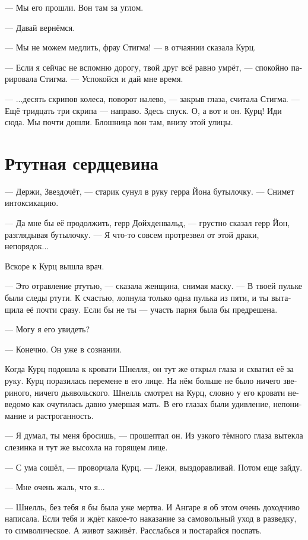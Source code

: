 \documentclass[a4paper,12pt,fleqn]{book}\usepackage{polyglossia}\setdefaultlanguage[babelshorthands=true]{russian}\setotherlanguage{english}\defaultfontfeatures{Ligatures=TeX,Mapping=tex-text}\usepackage{xcolor}\newcommand{\ml}[3]{#2}
\begin{document}
--- Мы его прошли.
Вон там за углом.

--- Давай вернёмся.

--- Мы не можем медлить, фрау Стигма! --- в отчаянии сказала Курц.

--- Если я сейчас не вспомню дорогу, твой друг всё равно умрёт, --- спокойно парировала Стигма.
--- Успокойся и дай мне время.

--- ...десять скрипов колеса, поворот налево, --- закрыв глаза, считала Стигма.
--- Ещё тридцать три скрипа --- направо.
Здесь спуск.
О, а вот и он.
Курц!
Иди сюда.
Мы почти дошли.
\ml{$0$}
{Блошница вон там, внизу этой улицы.}
{Fleafur is right there, at the end of this alley.''} %

\section{Ртутная сердцевина}

--- Держи, Звездочёт, --- старик сунул в руку герра Йона бутылочку.
--- Снимет интоксикацию.

--- Да мне бы её продолжить, герр Дойхденвальд, --- грустно сказал герр Йон, разглядывая бутылочку.
--- Я что-то совсем протрезвел от этой драки, непорядок...

Вскоре к Курц вышла врач.

--- Это отравление ртутью, --- сказала женщина, снимая маску.
--- В твоей пульке были следы ртути.
К счастью, лопнула только одна пулька из пяти, и ты вытащила её почти сразу.
Если бы не ты --- участь парня была бы предрешена.

--- Могу я его увидеть?

--- Конечно.
Он уже в сознании.

Когда Курц подошла к кровати Шнелля, он тут же открыл глаза и схватил её за руку.
Курц поразилась перемене в его лице.
На нём больше не было ничего звериного, ничего дьявольского.
Шнелль смотрел на Курц, словно у его кровати неведомо как очутилась давно умершая мать.
В его глазах были удивление, непонимание и растроганность.

--- Я думал, ты меня бросишь, --- прошептал он.
Из узкого тёмного глаза вытекла слезинка и тут же высохла на горящем лице.

--- С ума сошёл, --- проворчала Курц.
--- Лежи, выздоравливай.
Потом еще зайду.

--- Мне очень жаль, что я...

--- Шнелль, без тебя я бы была уже мертва.
И Ангаре я об этом очень доходчиво написала.
Если тебя и ждёт какое-то наказание за самовольный уход в разведку, то символическое.
А живот заживёт.
Расслабься и постарайся поспать.
\end{document}

